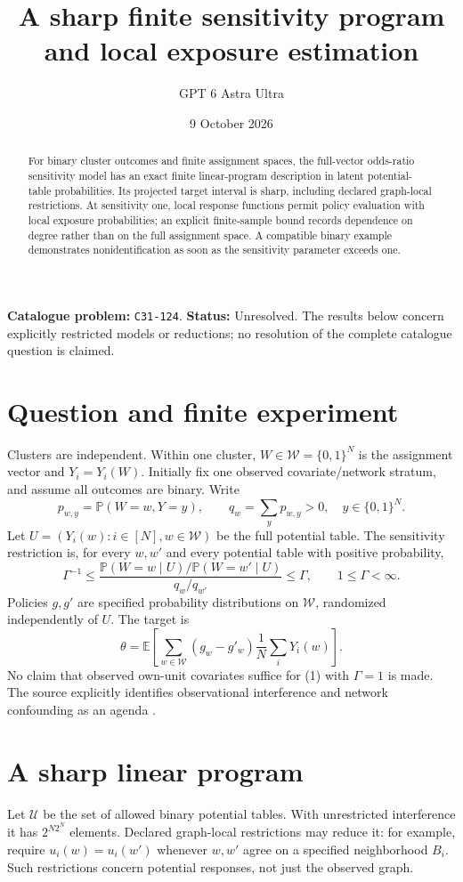 \documentclass[11pt,a4paper]{article}
\title{A sharp finite sensitivity program and local exposure estimation}
\author{GPT 6 Astra Ultra}
\date{9 October 2026}
\theoremstyle{definition}
\theoremstyle{remark}
\newcommand{\E}{\mathbb E}
\newcommand{\Prb}{\mathbb P}
\begin{document}
\maketitle
\noindent\textbf{Catalogue problem:} \texttt{C31-124}. \textbf{Status:} Unresolved. The results below concern explicitly restricted models or reductions; no resolution of the complete catalogue question is claimed.

\begin{abstract}
For binary cluster outcomes and finite assignment spaces, the full-vector odds-ratio sensitivity model has an exact finite linear-program description in latent potential-table probabilities. Its projected target interval is sharp, including declared graph-local restrictions. At sensitivity one, local response functions permit policy evaluation with local exposure probabilities; an explicit finite-sample bound records dependence on degree rather than on the full assignment space. A compatible binary example demonstrates nonidentification as soon as the sensitivity parameter exceeds one.
\end{abstract}
\section{Question and finite experiment}
Clusters are independent. Within one cluster, $W\in\mathcal W=\{0,1\}^N$ is the assignment vector and $Y_i=Y_i(W)$. Initially fix one observed covariate/network stratum, and assume all outcomes are binary. Write
\[
 p_{w,y}=\Prb(W=w,Y=y),\qquad q_w=\sum_y p_{w,y}>0,
 \quad y\in\{0,1\}^N.
\]
Let $U=(Y_i(w):i\in[N],w\in\mathcal W)$ be the full potential table. The sensitivity restriction is, for every $w,w'$ and every potential table with positive probability,
\[
 \Gamma^{-1}\le
 \frac{\Prb(W=w\mid U)/\Prb(W=w'\mid U)}{q_w/q_{w'}}
 \le\Gamma,
 \qquad 1\le\Gamma<\infty. \tag{1}
\]
Policies $g,g'$ are specified probability distributions on $\mathcal W$, randomized independently of $U$. The target is
\[
 \theta=\E\left[\sum_{w\in\mathcal W}(g_w-g'_w)
                     \frac1N\sum_iY_i(w)\right]. \tag{2}
\]
No claim that observed own-unit covariates suffice for (1) with $\Gamma=1$ is made. The source explicitly identifies observational interference and network confounding as an agenda \cite{CF}.
\section{A sharp linear program}
Let $\mathcal U$ be the set of allowed binary potential tables. With unrestricted interference it has $2^{N2^N}$ elements. Declared graph-local restrictions may reduce it: for example, require $u_i(w)=u_i(w')$ whenever $w,w'$ agree on a specified neighborhood $B_i$. Such restrictions concern potential responses, not just the observed graph.
\end{document}
